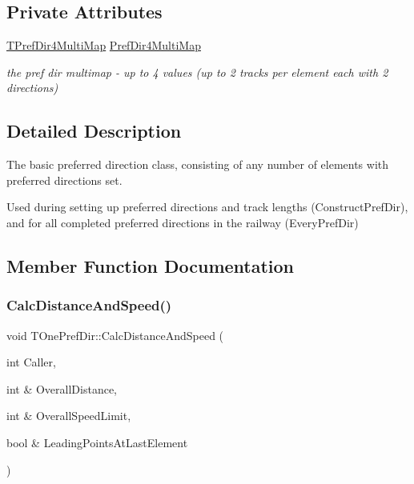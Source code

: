 \subsection*{Private Attributes}
\begin{DoxyCompactItemize}
\item 
\mbox{\label{class_t_one_pref_dir_aa6738f8f24fe0a417a84388c049b5e4c}} 
\mbox{\hyperlink{class_t_one_pref_dir_a940ba2bdbedb288c8188c1da5c4c79bc}{T\+Pref\+Dir4\+Multi\+Map}} \mbox{\hyperlink{class_t_one_pref_dir_aa6738f8f24fe0a417a84388c049b5e4c}{Pref\+Dir4\+Multi\+Map}}
\begin{DoxyCompactList}\small\item\em the pref dir multimap -\/ up to 4 values (up to 2 tracks per element each with 2 directions) \end{DoxyCompactList}\end{DoxyCompactItemize}


\subsection{Detailed Description}
The basic preferred direction class, consisting of any number of elements with preferred directions set.

Used during setting up preferred directions and track lengths (Construct\+Pref\+Dir), and for all completed preferred directions in the railway (Every\+Pref\+Dir) 

\subsection{Member Function Documentation}
\mbox{\label{class_t_one_pref_dir_abadb0c99b24d6dbfda371d96b308fc6e}} 
\subsubsection{\texorpdfstring{Calc\+Distance\+And\+Speed()}{CalcDistanceAndSpeed()}}
{\footnotesize\ttfamily void T\+One\+Pref\+Dir\+::\+Calc\+Distance\+And\+Speed (\begin{DoxyParamCaption}\item[{int}]{Caller,  }\item[{int \&}]{Overall\+Distance,  }\item[{int \&}]{Overall\+Speed\+Limit,  }\item[{bool \&}]{Leading\+Points\+At\+Last\+Element }\end{DoxyParamCaption})}


